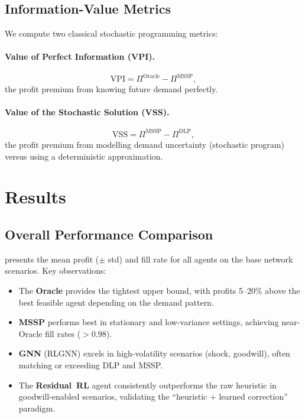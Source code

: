 \documentclass[preprint,12pt]{elsarticle}
\begin{document}
\subsection{Information-Value Metrics}

We compute two classical stochastic programming metrics:

\paragraph{Value of Perfect Information (VPI).}
\begin{equation}\label{eq:vpi}
  \text{VPI} = \Pi^{\text{Oracle}} - \Pi^{\text{MSSP}},
\end{equation}
the profit premium from knowing future demand perfectly.

\paragraph{Value of the Stochastic Solution (VSS).}
\begin{equation}\label{eq:vss}
  \text{VSS} = \Pi^{\text{MSSP}} - \Pi^{\text{DLP}},
\end{equation}
the profit premium from modelling demand uncertainty (stochastic program)
versus using a deterministic approximation.


\section{Results}\label{sec:results}

\subsection{Overall Performance Comparison}

 presents the mean profit (\(\pm\) std) and fill
rate for all agents on the base network scenarios. Key observations:

\begin{itemize}
  \item The \textbf{Oracle} provides the tightest upper bound, with
        profits 5--20\% above the best feasible agent depending on the
        demand pattern.
  \item \textbf{MSSP} performs best in stationary and low-variance
        settings, achieving near-Oracle fill rates ($>0.98$).
  \item \textbf{GNN} (RLGNN) excels in high-volatility scenarios
        (shock, goodwill), often matching or exceeding DLP and MSSP.
  \item The \textbf{Residual~RL} agent consistently outperforms the raw
        heuristic in goodwill-enabled scenarios, validating the
        ``heuristic + learned correction'' paradigm.
\end{itemize}
\end{document}

